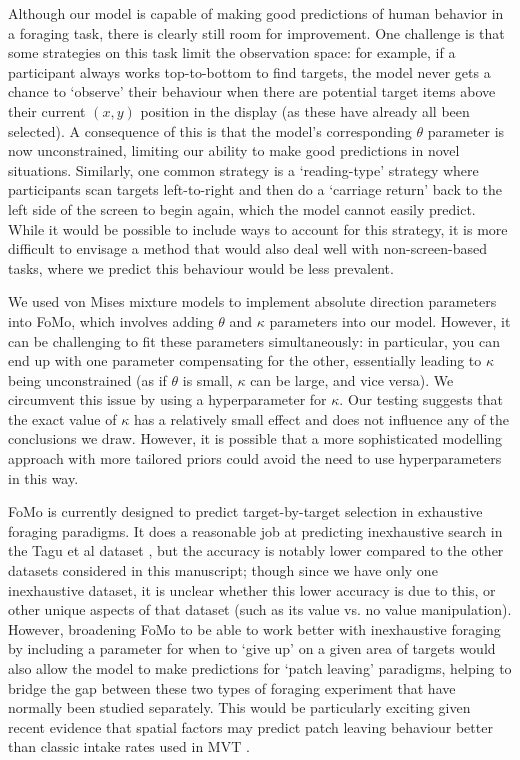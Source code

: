 \documentclass[man, floatsintext]{apa7}
\begin{document}
Although our model is capable of making good predictions of human behavior in a foraging task, there is clearly still room for improvement. One challenge is that some strategies on this task limit the observation space: for example, if a participant always works top-to-bottom to find targets, the model never gets a chance to `observe' their behaviour when there are potential target items above their current $(x, y)$ position in the display (as these have already all been selected). A consequence of this is that the model's corresponding $\theta$ parameter is now unconstrained, limiting our ability to make good predictions in novel situations. Similarly, one common strategy is a `reading-type' strategy where participants scan targets left-to-right and then do a `carriage return' back to the left side of the screen to begin again, which the model cannot easily predict. While it would be possible to include ways to account for this strategy, it is more difficult to envisage a method that would also deal well with non-screen-based tasks, where we predict this behaviour would be less prevalent.

We used von Mises mixture models to implement absolute direction parameters into FoMo, which involves adding $\theta$ and $\kappa$ parameters into our model. However, it can be challenging to fit these parameters simultaneously: in particular, you can end up with one parameter compensating for the other, essentially leading to $\kappa$ being unconstrained (as if $\theta$ is small, $\kappa$ can be large, and vice versa). We circumvent this issue by using a hyperparameter for $\kappa$. Our testing suggests that the exact value of $\kappa$ has a relatively small effect and does not influence any of the conclusions we draw. However, it is possible that a more sophisticated modelling approach with more tailored priors could avoid the need to use hyperparameters in this way.

FoMo is currently designed to predict target-by-target selection in exhaustive foraging paradigms. It does a reasonable job at predicting inexhaustive search in the Tagu et al dataset \cite{tagu2020}, but the accuracy is notably lower compared to the other datasets considered in this manuscript; though since we have only one inexhaustive dataset, it is unclear whether this lower accuracy is due to this, or other unique aspects of that dataset (such as its value vs. no value manipulation). However, broadening FoMo to be able to work better with inexhaustive foraging by including a parameter for when to `give up' on a given area of targets would also allow the model to make predictions for `patch leaving' paradigms, helping to bridge the gap between these two types of foraging experiment that have normally been studied separately. This would be particularly exciting given recent evidence that spatial factors may predict patch leaving behaviour better than classic intake rates used in MVT \cite{bella2025one}.
\end{document}
